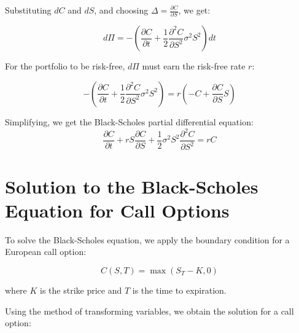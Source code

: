 \documentclass[../Main.tex]{subfiles}
\begin{document}
{Substituting \( dC \) and \( dS \), and choosing \( \Delta = \frac{\partial C}{\partial S} \), we get:

\begin{equation}
    d\Pi = -\left( \frac{\partial C}{\partial t} + \frac{1}{2} \frac{\partial^2 C}{\partial S^2} \sigma^2 S^2 \right) dt
\end{equation}

For the portfolio to be risk-free, \( d\Pi \) must earn the risk-free rate \( r \):

\begin{equation}
    -\left( \frac{\partial C}{\partial t} + \frac{1}{2} \frac{\partial^2 C}{\partial S^2} \sigma^2 S^2 \right) = r \left( -C + \frac{\partial C}{\partial S} S \right)
\end{equation}

Simplifying, we get the Black-Scholes partial differential equation:
\begin{equation*}
    \frac{\partial C}{\partial t} + r S \frac{\partial C}{\partial S} + \frac{1}{2} \sigma^2 S^2 \frac{\partial^2 C}{\partial S^2} = r C
\end{equation*}

}



\section{Solution to the Black-Scholes Equation for Call Options}

To solve the Black-Scholes equation, we apply the boundary condition for a European call option:

\begin{equation}
    C(S, T) = \max(S_T - K, 0)
\end{equation}

where \( K \) is the strike price and \( T \) is the time to expiration.

Using the method of transforming variables, we obtain the solution for a call option:

\end{document}
